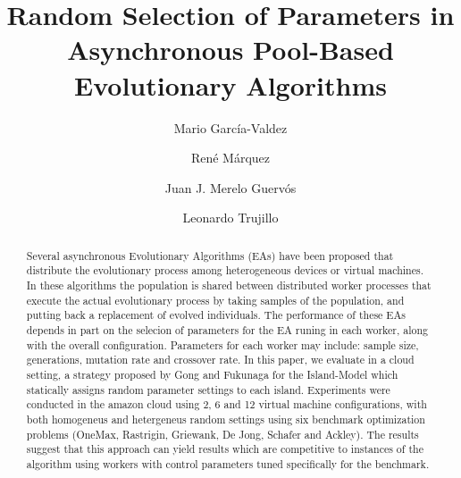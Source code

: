 \documentclass{llncs}
\begin{document}
\sloppy

\title{Random Selection of Parameters in Asynchronous Pool-Based Evolutionary Algorithms}

\author{Mario Garc\'ia-Valdez \and Ren\'e M\'arquez \and Juan J. Merelo Guerv\'os \and  Leonardo Trujillo }


\maketitle

\begin{abstract}
Several asynchronous Evolutionary Algorithms (EAs) have been proposed that distribute the
evolutionary process among heterogeneous devices or virtual machines.
In these algorithms the population is shared between distributed worker processes that 
execute the actual evolutionary process by taking samples of the population, and putting back
a replacement of evolved individuals. The performance of these EAs depends in part 
on the selecion of parameters for the EA runing in each worker, 
along with the overall configuration. Parameters for each worker may include: 
sample size, generations, mutation rate and crossover rate. In this paper, we evaluate in a cloud 
setting, a strategy proposed by Gong and Fukunaga for the Island-Model which statically 
assigns random parameter settings to each island. Experiments were conducted in the amazon
cloud using 2, 6 and 12 virtual machine configurations, with both homogeneus and hetergeneus
random settings using six benchmark optimization problems (OneMax, Rastrigin, Griewank, De Jong, Schafer
and Ackley). The results suggest that this approach can yield results which are competitive to
instances of the algorithm using workers with control parameters tuned specifically for the 
benchmark. 

\end{abstract}
\end{document}
